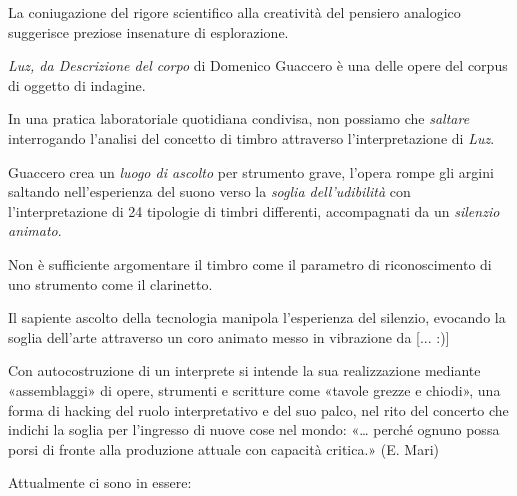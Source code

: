 \documentclass{gs-adonis}
\begin{document}
La coniugazione del rigore scientifico alla creatività del pensiero analogico
suggerisce preziose insenature di esplorazione.

\emph{Luz, da Descrizione del corpo} di Domenico Guaccero è una delle opere del
corpus di oggetto di indagine.

In una pratica laboratoriale quotidiana condivisa, non possiamo che
\emph{saltare} interrogando l'analisi del concetto di timbro attraverso
l'interpretazione di \emph{Luz}.

Guaccero crea un \emph{luogo di ascolto} per strumento grave, l'opera rompe
gli argini saltando nell'esperienza del suono verso la
\emph{soglia dell'udibilità} con l'interpretazione di 24 tipologie di timbri
differenti, accompagnati da un \emph{silenzio animato}.

Non è sufficiente argomentare il timbro come il parametro di riconoscimento di
uno strumento come il clarinetto.

Il sapiente ascolto della tecnologia manipola l'esperienza del silenzio,
evocando la soglia dell'arte attraverso un coro animato messo in vibrazione da
[... :)]

Con autocostruzione di un interprete si intende la sua realizzazione mediante
«assemblaggi» di opere, strumenti e scritture come «tavole grezze e chiodi»,
una forma di hacking del ruolo interpretativo e del suo palco, nel rito del
concerto che indichi la soglia per l'ingresso di nuove cose nel mondo:
«… perché ognuno possa porsi di fronte alla produzione
attuale con capacità critica.» (E. Mari)


Attualmente ci sono in essere:
\end{document}

